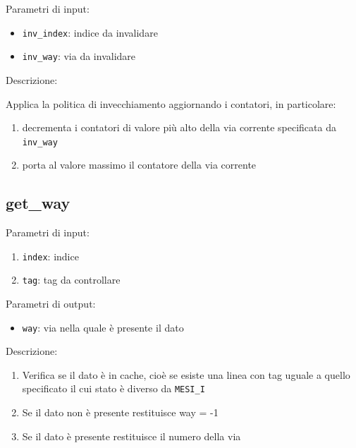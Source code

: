 Parametri di input:
\begin{itemize}
  \item \texttt{inv\_index}: indice da invalidare
  \item \texttt{inv\_way}: via da invalidare
\end{itemize}

Descrizione:

Applica la politica di invecchiamento aggiornando i contatori, in particolare:
\begin{enumerate}
  \item decrementa i contatori di valore pi\`u alto della via corrente specificata da \texttt{inv\_way}
  \item porta al valore massimo il contatore della via corrente
\end{enumerate}	
	

\subsection{get\_way} %

Parametri di input:
\begin{enumerate}
  \item \texttt{index}: indice
  \item \texttt{tag}: tag da controllare
\end{enumerate}	

Parametri di output:
\begin{itemize}
  \item \texttt{way}: via nella quale \`e presente il dato
\end{itemize}

Descrizione:	
\begin{enumerate}
  \item Verifica se il dato \`e in cache, cio\`e se esiste una linea con tag uguale a quello specificato il cui stato \`e diverso da \texttt{MESI\_I}
  \item Se il dato non \`e presente restituisce way = -1
  \item Se il dato \`e presente restituisce il numero della via
\end{enumerate}
	
	
%	


